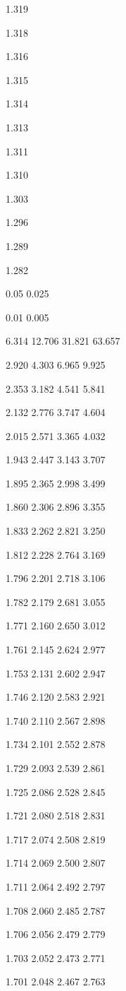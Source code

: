 \documentclass[a4paper,portrait,12pt]{article}
\begin{document}
1.319


1.318


1.316


1.315


1.314


1.313


1.311


1.310


1.303


1.296


1.289


1.282





0.05 0.025


0.01 0.005


6.314 12.706 31.821 63.657


2.920 4.303 6.965 9.925


2.353 3.182 4.541 5.841


2.132 2.776 3.747 4.604


2.015 2.571 3.365 4.032


1.943 2.447 3.143 3.707


1.895 2.365 2.998 3.499


1.860 2.306 2.896 3.355


1.833 2.262 2.821 3.250


1.812 2.228 2.764 3.169


1.796 2.201 2.718 3.106


1.782 2.179 2.681 3.055


1.771 2.160 2.650 3.012


1.761 2.145 2.624 2.977


1.753 2.131 2.602 2.947


1.746 2.120 2.583 2.921


1.740 2.110 2.567 2.898


1.734 2.101 2.552 2.878


1.729 2.093 2.539 2.861


1.725 2.086 2.528 2.845


1.721 2.080 2.518 2.831


1.717 2.074 2.508 2.819


1.714 2.069 2.500 2.807


1.711 2.064 2.492 2.797


1.708 2.060 2.485 2.787


1.706 2.056 2.479 2.779


1.703 2.052 2.473 2.771


1.701 2.048 2.467 2.763
\end{document}
